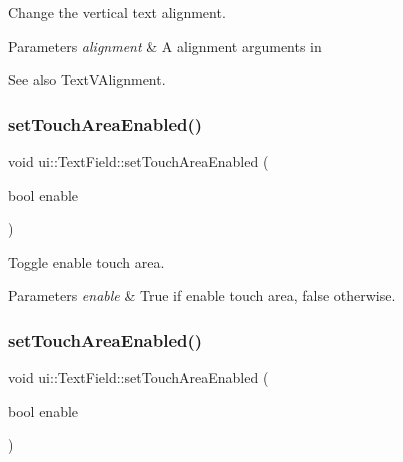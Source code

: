 Change the vertical text alignment. 


\begin{DoxyParams}{Parameters}
{\em alignment} & A alignment arguments in \\
\hline
\end{DoxyParams}
\begin{DoxySeeAlso}{See also}
{\ttfamily Text\+V\+Alignment}. 
\end{DoxySeeAlso}
\mbox{\label{classui_1_1TextField_a3321c112af10e67485ca44ab44a1ae0c}} 
\subsubsection{\texorpdfstring{set\+Touch\+Area\+Enabled()}{setTouchAreaEnabled()}\hspace{0.1cm}{\footnotesize\ttfamily [1/2]}}
{\footnotesize\ttfamily void ui\+::\+Text\+Field\+::set\+Touch\+Area\+Enabled (\begin{DoxyParamCaption}\item[{bool}]{enable }\end{DoxyParamCaption})}



Toggle enable touch area. 


\begin{DoxyParams}{Parameters}
{\em enable} & True if enable touch area, false otherwise. \\
\hline
\end{DoxyParams}
\mbox{\label{classui_1_1TextField_a3321c112af10e67485ca44ab44a1ae0c}} 
\subsubsection{\texorpdfstring{set\+Touch\+Area\+Enabled()}{setTouchAreaEnabled()}\hspace{0.1cm}{\footnotesize\ttfamily [2/2]}}
{\footnotesize\ttfamily void ui\+::\+Text\+Field\+::set\+Touch\+Area\+Enabled (\begin{DoxyParamCaption}\item[{bool}]{enable }\end{DoxyParamCaption})}



